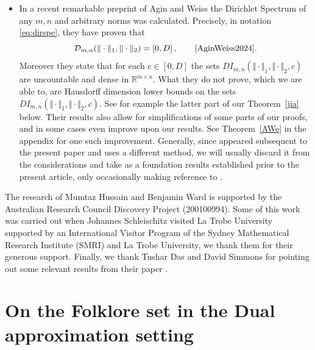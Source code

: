 \documentclass[10pt]{amsart}
\theoremstyle{definition}
\newcommand{\R}{\mathbb{R}}
\begin{document}
\begin{itemize}
    \item In a recent remarkable preprint of Agin and Weiss \cite{AginWeiss2024} the Dirichlet Spectrum of any $m,n$ and arbitrary norms was calculated. Precisely, in notation \eqref{eq:dirspe}, they have proven that
    \begin{equation*}
    \mathcal{D}_{m,n}(\Vert\cdot\Vert_1,\Vert\cdot\Vert_2)=[0,D]\, , \quad \quad \text{\cite[Theorem 1]{AginWeiss2024}}.
    \end{equation*}
    Moreover they state that for each $c\in[0,D]$ the sets $DI_{m,n}(\Vert\cdot\Vert_1,\Vert\cdot\Vert_2,c)$ are uncountable and dense in $\R^{m\times n}$. What they do not prove, which we are able to, are Hausdorff dimension lower bounds on the sets $DI_{m,n}(\Vert\cdot\Vert_1,\Vert\cdot\Vert_2,c)$. See for example the latter part of our Theorem~\ref{jia} below. Their results also allow for simplifications of some parts of our proofs, and in some cases even improve upon our results. See Theorem~\ref{AWe} in the appendix for one such improvement. Generally, since \cite{AginWeiss2024} appeared subsequent to the present paper and uses a different method, we will usually discard it from the considerations and take as a foundation results established prior to the present article, only occasionally making reference to \cite{AginWeiss2024}.
\end{itemize}

 The research of Mumtaz Hussain and Benjamin Ward is supported by the Australian
Research Council Discovery Project (200100994). Some of this work was carried out when Johannes Schleischitz visited La Trobe University supported by an International Visitor Program of the Sydney Mathematical Research Institute (SMRI) and La Trobe University, we thank them for their generous support. Finally, we thank Tushar Das and David Simmons for pointing out some relevant results from their paper \cite{Dasetal}.
 
\section{On the Folklore set in the Dual approximation setting}
\label{dual results}
\end{document}
